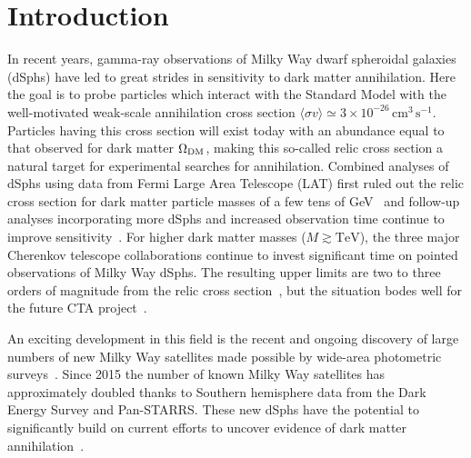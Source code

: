 \documentclass[prd,twocolumn,showpacs,preprintnumbers,superscriptaddress,nofootinbib,amsmath,amssymb,nobalancelastpage]{revtex4}
\def\sigv{{\langle\sigma v\rangle}}
\begin{document}

\maketitle

\section{Introduction}

In recent years, gamma-ray observations of Milky Way dwarf spheroidal galaxies (dSphs) have
led to great strides in sensitivity to dark matter annihilation. Here
the goal is to probe particles which interact with the Standard Model with the well-motivated weak-scale annihilation
cross section $\sigv \simeq 3 \times 10^{-26}\,\mathrm{cm^3 \,s^{-1}}$. Particles having this cross section will exist today with an abundance equal to that observed for dark matter $\Omega_{\rm DM}$, making this so-called relic cross section a natural target for experimental searches for annihilation.
Combined analyses of dSphs using data from
Fermi Large Area Telescope (LAT) first ruled out the relic cross section for dark matter particle masses of a few tens of
GeV~\cite{2011PhRvL.107x1303G,2011PhRvL.107x1302A} and follow-up
analyses incorporating more dSphs and increased observation time
continue to improve
sensitivity~\cite[e.g.][]{2014PhRvD..89d2001A,2015PhRvD..91h3535G,2015PhRvL.115w1301A}. For
higher dark matter masses ($M \gtrsim \mathrm{TeV}$), the three major
Cherenkov telescope collaborations continue to invest significant time
on pointed observations of Milky Way dSphs. The resulting upper limits
are two to three orders of magnitude from the relic cross
section~\cite{2012PhRvD..85f2001A,2014JCAP...02..008A,2014PhRvD..90k2012A,2016JCAP...02..039M,2015arXiv150901105Z},
but the situation bodes well for the future CTA
project~\cite[e.g.][]{2015arXiv150806128C}.

An exciting development in this field is the recent and
ongoing discovery of large numbers of new Milky Way satellites made
possible by wide-area photometric
surveys~\cite[e.g.][]{2015ApJ...805..130K,2015ApJ...807...50B,2015ApJ...802L..18L,2015ApJ...813..109D}. Since
2015 the number of known Milky Way satellites has approximately
doubled thanks to Southern hemisphere data from the Dark Energy Survey
and Pan-STARRS. These new dSphs have the potential to significantly
build on current efforts to uncover evidence of dark matter
annihilation~\cite[e.g.][]{2015PhRvD..91f3515H,2015PhRvL.115h1101G,2015ApJ...809L...4D,2015JCAP...09..016H,2015arXiv151109252L}.
\end{document}

